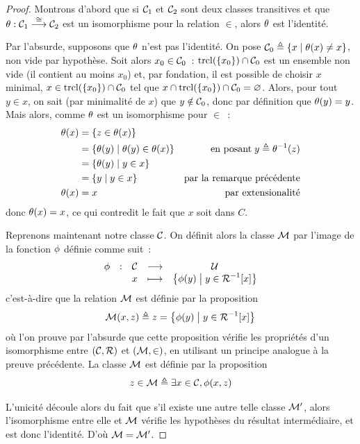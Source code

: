 \begin{proof}
  Montrons d'abord que si $\mathcal{C}_1$ et $\mathcal{C}_2$ sont deux classes transitives
  et que $\theta : \displaystyle \mathcal{C}_1 \overset{\cong}{\longrightarrow} \mathcal{C}_2$ est un isomorphisme
  pour la relation $\in$, alors $\theta$ est l'identité.

  Par l'absurde, supposons que $\theta$ n'est pas l'identité. On pose
  $\mathcal{C}_0 \triangleq \left\{ x \;\middle\vert\; \theta(x)\neq x \right\}$, non vide par hypothèse. Soit
  alors $x_0 \in \mathcal{C}_0$~: $\operatorname{trcl}(\{x_0\}) \cap \mathcal{C}_0$ est un ensemble non
  vide (il contient au moins $x_0$) et, par
  fondation, il est possible de choisir $x$ minimal, 
  $x \in \operatorname{trcl}(\{x_0\})\cap \mathcal{C}_0$ tel que
  $x\cap \operatorname{trcl}(\{x_0\})\cap \mathcal{C}_0 = \varnothing$. Alors,
  pour tout $y \in x$, on sait (par minimalité de $x$) que $y\notin \mathcal{C}_0$,
  donc par définition que $\theta(y) = y$. Mais alors, comme $\theta$ est
  un isomorphisme pour $\in$~:
  \begin{align*}
    \theta(x) &= \{z \in \theta(x)\} \\
    &= \left\{ \theta(y) \;\middle\vert\; \theta(y) \in \theta(x) \right\} &
    \text{en posant}\; y \triangleq \theta^{-1}(z) \\
    &= \left\{ \theta(y) \;\middle\vert\; y \in x \right\} \\
    &= \left\{ y \;\middle\vert\; y \in x \right\} & \text{par la remarque précédente}\\
    \theta(x) &= x & \text{par extensionalité}
  \end{align*}
  donc $\theta(x) = x$, ce qui contredit le fait que $x$ soit dans $C$.

  Reprenons maintenant notre classe $\mathcal{C}$. On définit alors la classe
  $\mathcal{M}$ par l'image de la fonction $\phi$ définie comme suit~:
  \[
  \makeFun{\varCol}{\varCC}{\unZF}{x}{\compr{\varCol(y)}{y\in\LclR{x}}}
  \]
  c'est-à-dire que la relation $\mathcal{M}$ est définie par la proposition
  \[\mathcal{M}(x,z) \triangleq z = \left\{ \phi(y) \;\middle\vert\; y \in \mathord{\mathrel{\mathcal{R}}}^{-1}[x] \right\}\]
  où l'on prouve par l'absurde que cette proposition vérifie les propriétés d'un
  isomorphisme entre $(\mathcal{C},\mathrel{\mathcal{R}})$ et $(\mathcal{M},\in)$, en utilisant un
  principe analogue à la preuve précédente. La classe $\mathcal{M}$ est définie
  par la proposition
  \[z \in \mathcal{M} \triangleq \exists x\in\mathcal{C}, \phi(x,z)\]

  L'unicité découle alors du fait que s'il existe une autre telle classe
  $\mathcal{M}'$, alors l'isomorphisme entre elle et $\mathcal{M}$ vérifie les
  hypothèses du résultat intermédiaire, et est donc l'identité. D'où
  $\mathcal{M} = \mathcal{M}'$.
\end{proof}

